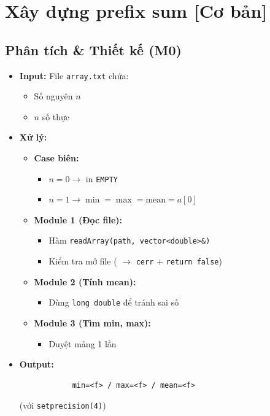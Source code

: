 \section{Xây dựng prefix sum [Cơ bản]}
\subsection{Phân tích \& Thiết kế (M0)}
    \begin{itemize}
    \item \textbf{Input:}
    File \texttt{array.txt} chứa:
    \begin{itemize}
        \item Số nguyên $n$
        \item $n$ số thực
    \end{itemize}

    \item \textbf{Xử lý:}
        \begin{itemize}
            \item \textbf{Case biên:}
            \begin{itemize}
                \item $n = 0 \rightarrow$ in \texttt{EMPTY}
                \item $n = 1 \rightarrow \min = \max = \text{mean} = a[0]$
            \end{itemize}
            
            \item \textbf{Module 1 (Đọc file):}
            \begin{itemize}
                \item Hàm \texttt{readArray(path, vector<double>\&)}
                \item Kiểm tra mở file ( $\rightarrow$ \texttt{cerr} + \texttt{return false})
            \end{itemize}
            
            \item \textbf{Module 2 (Tính mean):}
            \begin{itemize}
                \item Dùng \texttt{long double} để tránh sai số
            \end{itemize}
            
            \item \textbf{Module 3 (Tìm min, max):}
            \begin{itemize}
                \item Duyệt mảng 1 lần
            \end{itemize}
        \end{itemize}

        \item \textbf{Output:}
        \begin{lstlisting}
            min=<f> / max=<f> / mean=<f>\end{lstlisting} 
        (với \texttt{setprecision(4)})
    \end{itemize}

